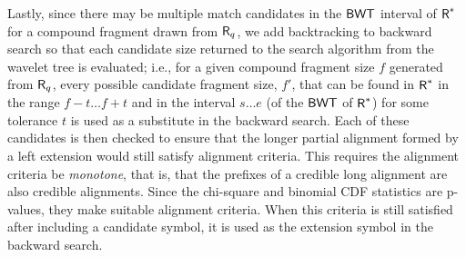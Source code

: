 Lastly, since there may be multiple match candidates in the $\mbox{\rm {\sf BWT}}$ interval of $\mbox{\rm {\sf R}}^*$ 
for a compound fragment drawn from $\mbox{\rm {\sf R}}_q$, we add backtracking to backward search so that each candidate size returned to the search algorithm from the wavelet tree is evaluated; i.e., for a given compound fragment size $f$ generated from $\mbox{\rm {\sf R}}_q$, every possible candidate fragment size, $f'$, that can be found in $\mbox{\rm {\sf R}}^*$ in the range $f - t \ldots f + t$ and in the interval $s \ldots e$ (of the $\mbox{\rm {\sf BWT}}$ of $\mbox{\rm {\sf R}}^*$) for some tolerance $t$ is used as a substitute in the backward search. Each of these candidates is then checked to ensure that the longer partial alignment formed by a left extension would still satisfy alignment criteria.  This requires the alignment criteria be \emph{monotone}, that is, that the prefixes of a credible long alignment are also credible alignments.  Since the chi-square and binomial CDF statistics are p-values, they make suitable alignment criteria.   When this criteria is still satisfied after including a candidate symbol, it is used as the extension symbol in the backward search.
 
 





